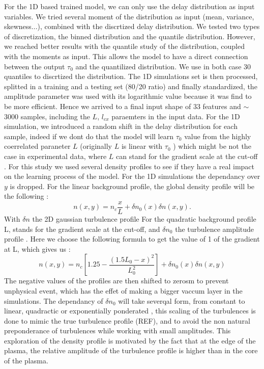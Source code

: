 \documentclass[11pt,a4paper,openany]{report}
\begin{document}
\begin{multicols}{2}
    For the 1D based trained model, we can only use the delay distribution as input variables. We tried several moment of the distribution as input (mean, variance, skewness...), combined with the discrtized delay distribution. We tested two types of discretization, the binned distribution and the quantile distribution. However, we reached better results with the quantile study of the distribution, coupled with the moments as input. This allows the model to have a direct connection between the output $\tau_0$ and the quantilized distribution. We use in both case 30 quantiles to discrtized the distribution. The 1D simulations set is then processed, splitted in a training and a testing set (80/20 ratio) and finally standardized, the amplitude parameter was used with its logarithmic value because it was find to be more efficient. Hence we arrived to a final input shape of 33 features and $\sim$ 3000 samples, including the $L$, $l_{cx}$ paraemters in the input data. For the 1D simulation, we introduced a random shift in the delay distribution for each sample, indeed if we dont do that the model will learn $\tau_0$ value from the highly coerrelated paraneter $L$ (originally $L$ is linear with $\tau_0$  ) which might be not the case in experimental data, where $L$ can stand for the gradient scale at the cut-off \cite{Krutkin_thesis}. For this study we used several density profiles to see if they have a real impact on the learning process of the model. For the 1D simulations the dependancy over $y$ is dropped.
    For the linear background profile, the global density profile will be the following :
    $$n(x,y) = n_c \frac{x}{L} + \delta n_0(x) \delta n(x,y).$$ With $\delta n $ the 2D gaussian turbulence profile
    For the quadratic background profile L, stands for the gradient scale at the cut-off, and $\delta n_0$ the turbulence amplitude profile . Here we choose the following formula to get the value of 1 of the gradient at L, which gives us :
    $$n(x,y) = n_c \left[1.25 - \frac{(1.5L_0 - x)^2}{L_0^2} \right] + \delta n_0(x)\delta n (x,y)$$
    The negative values of the profiles are then shifted to zerosm to prevent unphysical event, which has the effet of making a bigger vaccum layer in the simulations.
    The dependancy of $\delta n_0$ will take severqal form, from constant to linear, quadractic or exponentially ponderated \cite{SPR_Krutkin}, this scaling of the turbulences is done to mimic the true turbulence profile (REF), and to avoid the non natural preponderance of turbulences while working with small amplitudes. This exploration of the density profile is motivated by the fact that at the edge of the plasma, the relative amplitude of the turbulence profile is higher than in the core of the plasma.


\end{multicols}
\end{document}
